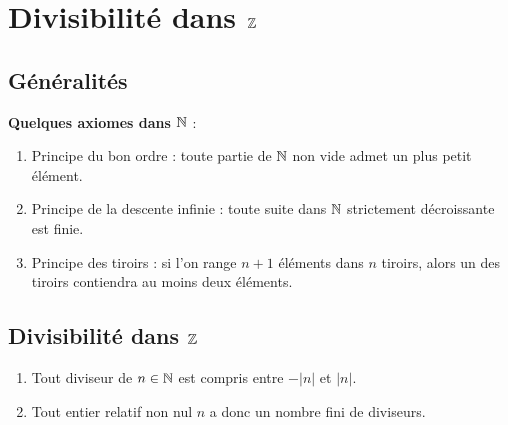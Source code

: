\documentclass[10pt,a4paper]{article}
\begin{document}

\section{Divisibilité dans $\mathbb{Z}$}

\subsection*{Généralités}


\textbf{Quelques axiomes dans $\mathbb{N}$} :


\begin{enumerate}[ \quad $\bullet$]
\item Principe du bon ordre : toute partie de $\mathbb{N}$ non vide admet un plus petit élément.
\item Principe de la descente infinie : toute suite dans $\mathbb{N}$ strictement décroissante est finie.
\item Principe des tiroirs : si l'on range $n+1$ éléments dans $n$ tiroirs, alors un des tiroirs contiendra au moins deux éléments.
\end{enumerate}

\subsection*{Divisibilité dans $\mathbb{Z}$}


\rems
\begin{enumerate}[$\bullet$]
\item Tout diviseur de $n \in \mathbb{N}$ est compris entre $-|n|$ et $|n|$.
\item Tout entier relatif non nul $n$ a donc un nombre fini de diviseurs.
\end{enumerate}
\end{document}

